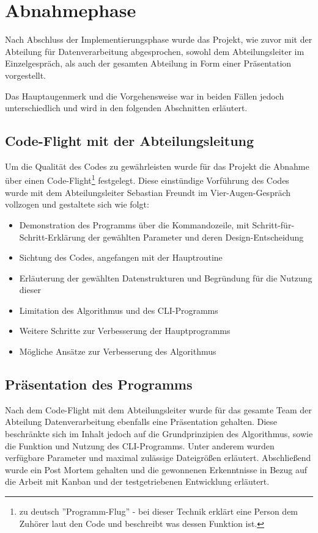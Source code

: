 \section{Abnahmephase}
\label{section:abnahmephase}
Nach Abschluss der Implementierungsphase wurde das Projekt, wie zuvor mit der
Abteilung für Datenverarbeitung abgesprochen, sowohl dem Abteilungsleiter im Einzelgespräch,
als auch der gesamten Abteilung in Form einer Präsentation vorgestellt.

Das Hauptaugenmerk und die Vorgehensweise war in beiden Fällen jedoch unterschiedlich
und wird in den folgenden Abschnitten erläutert.

\subsection{Code-Flight mit der Abteilungsleitung}

Um die Qualität des Codes zu gewährleisten wurde für das Projekt die Abnahme über einen Code-Flight\footnote{zu deutsch ''Programm-Flug'' - bei dieser Technik erklärt eine Person dem Zuhörer laut den Code und beschreibt was dessen Funktion ist.} festgelegt. Diese einstündige
Vorführung des Codes wurde mit dem Abteilungsleiter Sebastian Freundt im
Vier-Augen-Gespräch vollzogen und gestaltete sich wie folgt:

\begin{itemize}
    \item Demonstration des Programms über die Kommandozeile, mit Schritt-für-Schritt-Erklärung der gewählten Parameter und deren Design-Entscheidung
    \item Sichtung des Codes, angefangen mit der Hauptroutine
    \item Erläuterung der gewählten Datenstrukturen und Begründung für die Nutzung dieser
    \item Limitation des Algorithmus und des CLI-Programms
    \item Weitere Schritte zur Verbesserung der Hauptprogramms
    \item Mögliche Ansätze zur Verbesserung des Algorithmus
\end{itemize}

\subsection{Präsentation des Programms}

Nach dem Code-Flight mit dem Abteilungsleiter wurde für das gesamte Team der Abteilung Datenverarbeitung ebenfalls eine Präsentation gehalten.
Diese beschränkte sich im Inhalt jedoch auf die Grundprinzipien des Algorithmus, sowie
die Funktion und Nutzung des CLI-Programms. Unter anderem wurden verfügbare
Parameter und maximal zulässige Dateigrößen erläutert.
Abschließend wurde ein Post Mortem gehalten und die gewonnenen Erkenntnisse in Bezug auf die Arbeit mit Kanban und der testgetriebenen Entwicklung erläutert.